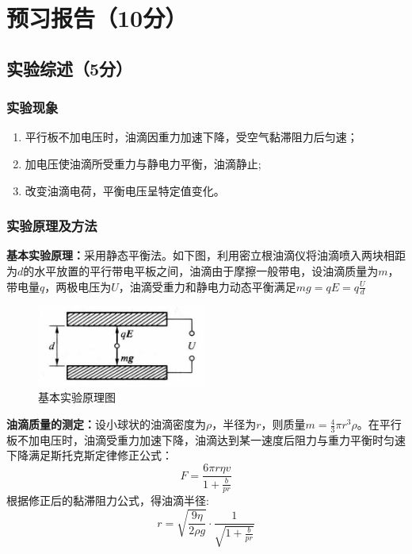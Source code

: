 \documentclass[]{../template/Report}%
\begin{document}
\makecover%

\section{预习报告（10分）}

\subsection{实验综述（5分）}
\subsubsection{实验现象}
\begin{enumerate}
    \item 平行板不加电压时，油滴因重力加速下降，受空气黏滞阻力后匀速；
    \item 加电压使油滴所受重力与静电力平衡，油滴静止;
    \item 改变油滴电荷，平衡电压呈特定值变化。
\end{enumerate}
\subsubsection{实验原理及方法}
\textbf{基本实验原理：}采用静态平衡法。如下图，利用密立根油滴仪将油滴喷入两块相距为$d$的水平放置的平行带电平板之间，油滴由于摩擦一般带电，设油滴质量为$m$，带电量$q$，两极电压为$U$，油滴受重力和静电力动态平衡满足$mg = qE = q\frac{U}{d}$
\begin{figure}[!h]
    \begin{center}
        \includegraphics[width=0.5\textwidth]{figues/limigen/yuanli.png}
        \caption{基本实验原理图}
    \end{center}
\end{figure}

\textbf{油滴质量的测定：}设小球状的油滴密度为$\rho$，半径为$r$，则质量$m = \frac{4}{3}\pi r^3\rho$。在平行板不加电压时，油滴受重力加速下降，油滴达到某一速度后阻力与重力平衡时匀速下降满足斯托克斯定律修正公式：
\[ F = \frac{6\pi r\eta v}{1 + \frac{b}{pr}} \]
根据修正后的黏滞阻力公式，得油滴半径:
\[ r = \sqrt{\frac{9\eta}{2\rho g}} \cdot \frac{1}{\sqrt{1 + \frac{b}{pr}}} \]
\end{document}
